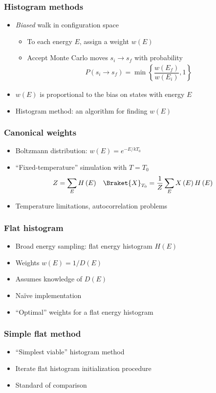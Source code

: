 \documentclass{beamer}
\newcommand{\bk}{\Braket} %
\newcommand{\p}[1]{\left(#1\right)} %
\renewcommand{\set}[1]{\left\{#1\right\}} %
\newcommand{\f}[2]{\dfrac{#1}{#2}}
\let\olditem\item
\renewcommand{\item}{\setlength{\itemsep}{6pt}\olditem}
\begin{document}
\begin{frame}
  \frametitle{Histogram methods}
  \begin{itemize}
  \item {\it Biased} walk in configuration space
    \begin{itemize}
    \item<2-> To each energy $E$, assign a weight $w\p{E}$
    \item<2-> Accept Monte Carlo moves $s_i\to s_f$ with probability
      \begin{align*}
        P\p{s_i\to s_f}=\min\set{\f{w\p{E_f}}{w\p{E_i}},1}
      \end{align*}
    \end{itemize}
  \item<3-> $w\p{E}$ is proportional to the bias on states with energy
    $E$
  \item<4> Histogram method: an algorithm for finding $w\p{E}$
  \end{itemize}
\end{frame}

\begin{frame}
  \frametitle{Canonical weights}
  \begin{itemize}
  \item Boltzmann distribution: $w\p{E}=e^{-E/kT_0}$
  \item<2-> ``Fixed-temperature'' simulation with $T=T_0$
    \begin{align*}
      Z=\sum_EH\p{E} && \bk{X}_{T_0}=\f1Z\sum_EX\p{E}H\p{E}
    \end{align*}
  \item<3> Temperature limitations, autocorrelation problems
  \end{itemize}
\end{frame}

\begin{frame}
  \frametitle{Flat histogram}
  \begin{itemize}
  \item Broad energy sampling: flat energy histogram $H\p{E}$
  \item<2-> Weights $w\p{E}=1/D\p{E}$
  \item<3-> Assumes knowledge of $D\p{E}$
  \item<4-> Na\"ive implementation
  \item<5> ``Optimal'' weights for a flat energy histogram
  \end{itemize}
\end{frame}

\begin{frame}
  \frametitle{Simple flat method}
  \begin{itemize}
  \item ``Simplest viable'' histogram method
  \item<2-> Iterate flat histogram initialization procedure
  \item<3> Standard of comparison
  \end{itemize}
\end{frame}
\end{document}
